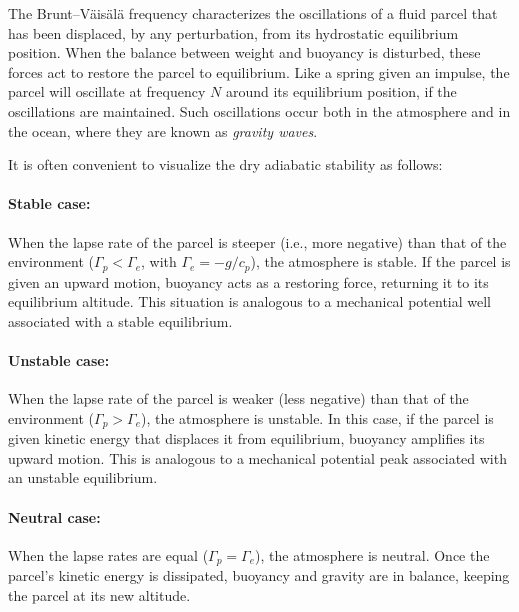     The Brunt–Väisälä frequency characterizes the oscillations of a fluid parcel that has been displaced, by any perturbation, from its hydrostatic equilibrium position. When the balance between weight and buoyancy is disturbed, these forces act to restore the parcel to equilibrium. Like a spring given an impulse, the parcel will oscillate at frequency \(N\) around its equilibrium position, if the oscillations are maintained. Such oscillations occur both in the atmosphere and in the ocean, where they are known as \emph{gravity waves}.
    

    It is often convenient to visualize the dry adiabatic stability as follows:
    
    \paragraph{Stable case:}  
    When the lapse rate of the parcel is steeper (i.e., more negative) than that of the environment (\(\Gamma_p < \Gamma_e\), with \(\Gamma_e = -g / c_p\)), the atmosphere is stable. If the parcel is given an upward motion, buoyancy acts as a restoring force, returning it to its equilibrium altitude. This situation is analogous to a mechanical potential well associated with a stable equilibrium.
    
    \paragraph{Unstable case:}  
    When the lapse rate of the parcel is weaker (less negative) than that of the environment (\(\Gamma_p > \Gamma_e\)), the atmosphere is unstable. In this case, if the parcel is given kinetic energy that displaces it from equilibrium, buoyancy amplifies its upward motion. This is analogous to a mechanical potential peak associated with an unstable equilibrium.
    
    \paragraph{Neutral case:}  
    When the lapse rates are equal (\(\Gamma_p = \Gamma_e\)), the atmosphere is neutral. Once the parcel’s kinetic energy is dissipated, buoyancy and gravity are in balance, keeping the parcel at its new altitude.
    \vspace{\baselineskip}

